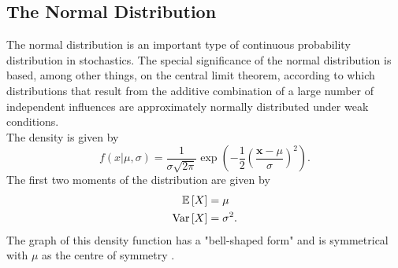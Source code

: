 \subsection{The Normal Distribution}
The normal distribution is an important type of continuous probability distribution in stochastics. The special significance of the normal distribution is based, among other things, on the central limit theorem, according to which distributions that result from the additive combination of a large number of independent influences are approximately normally distributed under weak conditions. \\
The density is given by
\begin{equation}
    f\left(x|\mu,\sigma\right)=\frac{1}{\sigma\sqrt{2\pi}}\exp\left(-\frac{1}{2}\left(\frac{\pmb{x}-\mu}{\sigma}\right)^2\right).
\end{equation}
The first two moments of the distribution are given by
\begin{align}
    \mathbb{E}\left[X\right] &= \mu \\
    \hbox{Var}\left[X\right] &= \sigma^2.
\end{align}
The graph of this density function has a "bell-shaped form" and is symmetrical with $\mu$ as the centre of symmetry \autocite[][83-85]{fahrmeir2016statistik}.
